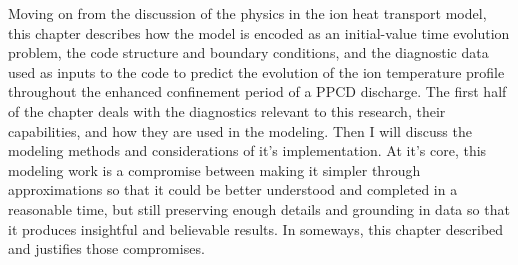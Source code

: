  Moving on from the discussion of the physics in the ion heat transport model, this chapter describes how the model is encoded as an initial-value time evolution problem, the code structure and boundary conditions, and the diagnostic data used as inputs to the code to predict the evolution of the ion temperature profile throughout the enhanced confinement period of a PPCD discharge. %
 The first half of the chapter deals with the diagnostics relevant to this research, their capabilities, and how they are used in the modeling. Then I will discuss the modeling methods and considerations of it's implementation.
 At it's core, this modeling work is a compromise between making it simpler through approximations so that it could be better understood and completed in a reasonable time, but still preserving enough details and grounding in data so that it produces insightful and believable results. In someways, this chapter described and justifies those compromises. 

